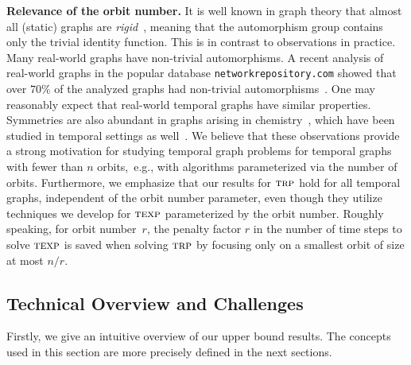 \documentclass[10pt,a4paper]{article}
\newcommand{\trp}{\textsc{trp}}
\newcommand{\texp}{\textsc{texp}}
\begin{document}
{ \textbf{Relevance of the orbit number.} {It is well
known in graph theory}
    that almost all (static) graphs are \textit{rigid}~\cite{BallGS18},
    meaning that the automorphism group contains only the trivial
    identity function. This is in contrast to observations in practice.
    Many real-world graphs have non-trivial automorphisms. A recent
    analysis of real-world graphs in the popular database
    \texttt{networkrepository.com} showed that over $70\%$ of the analyzed
    graphs had non-trivial automorphisms~\cite{BallGS18}. One may
    reasonably expect that real-world temporal graphs have similar
    properties. Symmetries are also abundant in graphs arising in
    chemistry~\cite{Balasubramanian82}, which have been studied in temporal
    settings as well~\cite{PlamperLH23}.
	{We believe that these observations provide a strong
	motivation for studying temporal graph problems for temporal
	graphs with fewer than $n$ orbits,{\ e.g., with
    algorithms parameterized via the number of orbits.}}
	{Furthermore, we emphasize that
    our results for $\trp$ {hold for all temporal graphs,}
	independent of the orbit number parameter,
even {though} they {utilize} techniques we develop for $\texp$
parameterized by the orbit number.} {Roughly speaking,
for orbit number~$r$, the penalty factor $r$ in the number of time steps 
to solve $\texp$ is saved when solving $\trp$ by focusing only on a smallest orbit of size at most $n/r$.
}
}

\subsection{Technical Overview and Challenges}
\label{subsec:tech-overview-challenges}


Firstly, we give an intuitive overview of our upper bound results. The concepts
used in this section are more precisely defined in the next sections.
\end{document}
